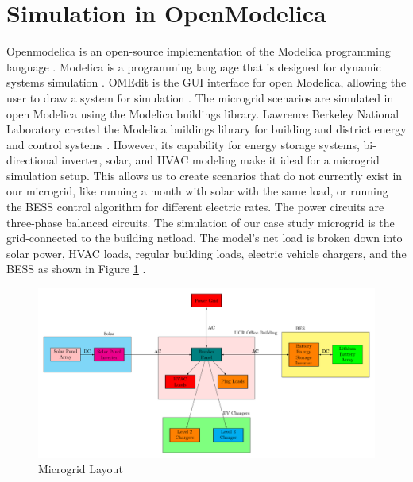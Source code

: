 \documentclass[conference]{IEEEtran}
\begin{document}
\section{Simulation in OpenModelica}
    	Openmodelica is an open-source implementation of the Modelica programming language \cite{OpenModelica}. Modelica is a programming language that is designed for dynamic systems simulation \cite{ModelicaLanguage}. OMEdit is the GUI interface for open Modelica, allowing the user to draw a system for simulation \cite{OMEdit}. The microgrid scenarios are simulated in open Modelica using the Modelica buildings library.  Lawrence Berkeley National Laboratory created the Modelica buildings library for building and district energy and control systems \cite{ModelicaBuildingsLibrary}. However, its capability for energy storage systems, bi-directional inverter, solar, and HVAC modeling make it ideal for a microgrid simulation setup. This allows us to create scenarios that do not currently exist in our microgrid, like running a month with solar with the same load, or running the BESS control algorithm for different electric rates.  The power circuits are three-phase balanced circuits. The simulation of our case study microgrid is the grid-connected to the building netload. The model's net load is broken down into solar power, HVAC loads, regular building loads, electric vehicle chargers, and the BESS as shown in Figure \ref{fig:powersystemsetupfull} . 
	\begin{figure}[H]
		\centering
		\includegraphics[width=1\linewidth]{Fig/power_system_setup_modelica}
		\caption{Microgrid Layout}
		\label{fig:powersystemsetupfull}
	\end{figure}
\end{document}
